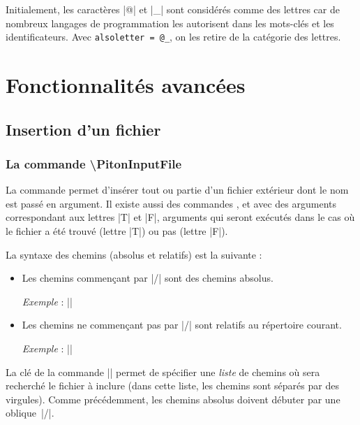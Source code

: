 \documentclass[dvipsnames,svgnames]{article}
\begin{document}
Initialement, les caractères |@| et |_| sont considérés comme des lettres car de nombreux
langages de programmation les autorisent dans les mots-clés et les identificateurs. Avec
\verb|alsoletter = @_|, on les retire de la catégorie des lettres.


\section{Fonctionnalités avancées}


\subsection{Insertion d'un fichier}

\label{PitonInputFile}

\subsubsection{La commande \textbackslash PitonInputFile}


La commande  permet d'insérer tout ou partie d'un
fichier extérieur dont le nom est passé en argument. Il existe aussi des commandes
,  et
 avec des arguments correspondant aux lettres |T| et
|F|, arguments qui seront exécutés dans le cas où le fichier a été trouvé (lettre |T|) ou
pas (lettre |F|).

\smallskip
La syntaxe des chemins (absolus et relatifs) est la suivante : 
\begin{itemize}
\item Les chemins commençant par |/| sont des chemins absolus.

\emph{Exemple} : ||

\item Les chemins ne commençant pas par |/| sont relatifs au répertoire courant.

\emph{Exemple} : ||
\end{itemize}


La clé  de la commande |\PitonOptions| permet de spécifier une
\emph{liste} de chemins où sera recherché le fichier à inclure (dans cette liste, les
chemins sont séparés par des virgules). Comme précédemment, les chemins absolus doivent
débuter par une oblique~|/|.
\end{document}
